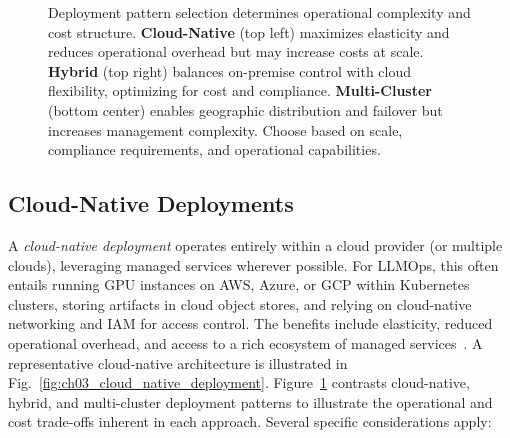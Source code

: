 \begin{figure}[t]
\begin{llmfigbox}
{\begin{tikzpicture}
\end{tikzpicture}%
}
\end{llmfigbox}
\caption{Deployment pattern selection determines operational complexity and cost structure. \textbf{Cloud-Native} (top left) maximizes elasticity and reduces operational overhead but may increase costs at scale. \textbf{Hybrid} (top right) balances on-premise control with cloud flexibility, optimizing for cost and compliance. \textbf{Multi-Cluster} (bottom center) enables geographic distribution and failover but increases management complexity. Choose based on scale, compliance requirements, and operational capabilities.}
\label{fig:ch03_deploy_patterns_balanced}
\end{figure}

\FloatBarrier
\subsection{Cloud-Native Deployments}
\label{sec:deploy-cloud}

A \emph{cloud-native deployment} operates entirely within a cloud provider (or multiple clouds), leveraging managed services wherever possible.
For LLMOps, this often entails running GPU instances on AWS, Azure, or GCP within Kubernetes clusters, storing artifacts in cloud object stores, and relying on cloud-native networking and IAM for access control.
The benefits include elasticity, reduced operational overhead, and access to a rich ecosystem of managed services~\cite{terraform-docs,awscdk-docs}.
A representative cloud-native architecture is illustrated in Fig.~\ref{fig:ch03_cloud_native_deployment}. Figure~\ref{fig:ch03_deploy_patterns_balanced} contrasts cloud-native, hybrid, and multi-cluster deployment patterns to illustrate the operational and cost trade-offs inherent in each approach.
Several specific considerations apply:

